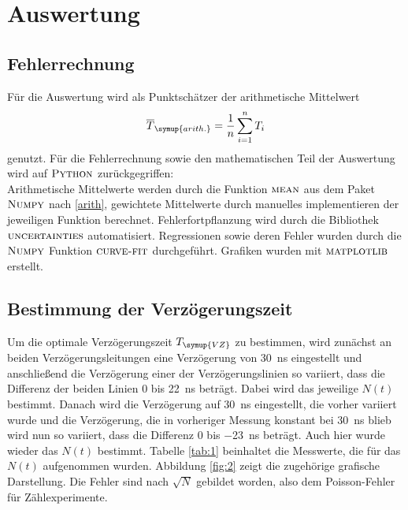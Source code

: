 \documentclass[
  bibliography=totoc,     %
  captions=tableheading,  %
  titlepage=firstiscover, %
]{scrartcl}
\begin{document}
\section{Auswertung}
\label{sec:auswertung}

\subsection{Fehlerrechnung}
  Für die Auswertung wird als Punktschätzer der arithmetische Mittelwert
  \begin{equation}
    \overline{T}_{\symup{arith.}} = \frac{1}{n} \sum_{i=1}^{n} T_{i}
    \label{arith}
  \end{equation}
  genutzt.
    Für die Fehlerrechnung sowie den mathematischen Teil der Auswertung wird auf
    $\textsc{Python}$ zurückgegriffen:\\
    Arithmetische Mittelwerte werden durch die Funktion $\textsc{mean}$ aus dem
    Paket $\textsc{Numpy}$ nach \eqref{arith},
    gewichtete Mittelwerte durch manuelles implementieren der jeweiligen
    Funktion berechnet. Fehlerfortpflanzung wird durch die Bibliothek
    $\textsc{uncertainties}$ automatisiert. Regressionen
    sowie deren Fehler wurden durch die $\textsc{Numpy}$ Funktion
    $\textsc{curve-fit}$ durchgeführt. Grafiken wurden mit $\textsc{matplotlib}$
    erstellt.
\subsection{Bestimmung der Verzögerungszeit}
Um die optimale Verzögerungszeit $T_{\symup{VZ}}$ zu bestimmen, wird zunächst an beiden
Verzögerungsleitungen eine Verzögerung von \SI{30}{\nano\second} eingestellt und
anschließend die Verzögerung einer der Verzögerungslinien so variiert, dass die Differenz
der beiden Linien 0 bis \SI{22}{\nano\second} beträgt. Dabei wird das jeweilige $N(t)$ bestimmt.
Danach wird die Verzögerung auf \SI{30}{\nano\second} eingestellt, die vorher variiert
wurde und die Verzögerung, die in vorheriger Messung konstant bei \SI{30}{\nano\second}
blieb wird nun so variiert, dass die Differenz 0 bis \SI{-23}{\nano\second} beträgt.
Auch hier wurde wieder das $N(t)$ bestimmt. Tabelle \ref{tab:1} beinhaltet die
Messwerte, die für das $N(t)$ aufgenommen wurden. Abbildung \ref{fig:2} zeigt die
zugehörige grafische Darstellung. Die Fehler sind nach $\sqrt{N}$ gebildet
worden, also dem Poisson-Fehler für Zählexperimente.
\end{document}
